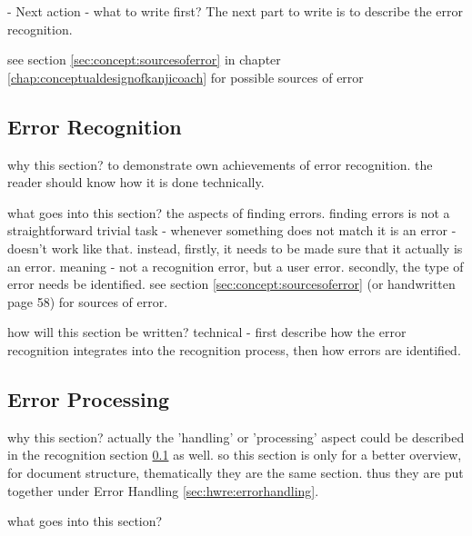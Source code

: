 - Next action - what to write first?
  The next part to write is to describe the error recognition.

see section \ref{sec:concept:sourcesoferror} in chapter 
\ref{chap:conceptualdesignofkanjicoach} for possible sources of error

\subsection{Error Recognition}
\label{sec:hwre:errorrecognition}

why this section? to demonstrate own achievements of error recognition.
the reader should know how it is done technically.

what goes into this section? the aspects of finding errors. finding errors
is not a straightforward trivial task - whenever something does not match
it is an error - doesn't work like that. instead, 
firstly, it needs to be made sure that it actually is an error.
meaning - not a recognition error, but a user error.
secondly, the type of error needs be identified.
see section \ref{sec:concept:sourcesoferror} (or handwritten page 58)
for sources of error.

how will this section be written?
technical - first describe how the error recognition integrates into the
recognition process, then how errors are identified.


\subsection{Error Processing}
\label{sec:hwre:errorprocessing}


why this section? 
actually the 'handling' or 'processing' aspect could be 
described in the recognition section \ref{sec:hwre:errorrecognition} as well.
so this section is only for a better overview, for document structure, 
thematically they are the same section. thus they are put together under
Error Handling \ref{sec:hwre:errorhandling}.

what goes into this section?


